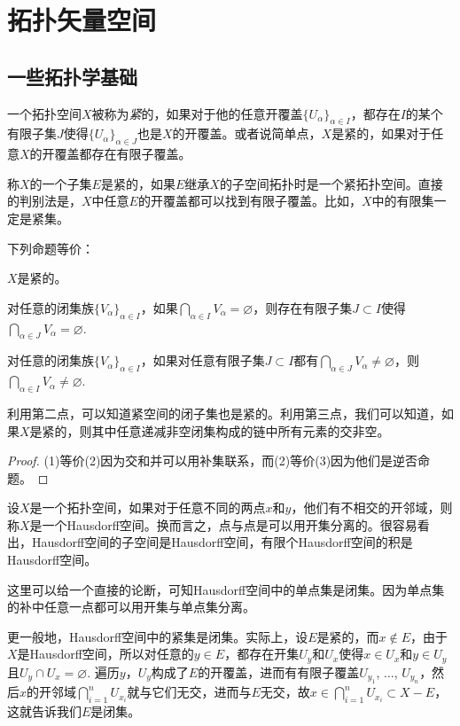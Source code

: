 \chapter{拓扑矢量空间}

\section{一些拓扑学基础}

一个拓扑空间$X$被称为\textit{紧}的，如果对于他的任意开覆盖$\{U_\alpha\}_{\alpha\in I}$，都存在$I$的某个有限子集$J$使得$\{U_\alpha\}_{\alpha\in J}$也是$X$的开覆盖。或者说简单点，$X$是紧的，如果对于任意$X$的开覆盖都存在有限子覆盖。

称$X$的一个子集$E$是紧的，如果$E$继承$X$的子空间拓扑时是一个紧拓扑空间。直接的判别法是，$X$中任意$E$的开覆盖都可以找到有限子覆盖。比如，$X$中的有限集一定是紧集。

\begin{pro}
下列命题等价：
\begin{compactenum}[(1)]
\item $X$是紧的。

\item 对任意的闭集族$\{V_\alpha\}_{\alpha\in I}$，如果$\bigcap_{\alpha\in I} V_\alpha=\varnothing$，则存在有限子集$J\subset I$使得$\bigcap_{\alpha\in J} V_\alpha=\varnothing$.

\item 对任意的闭集族$\{V_\alpha\}_{\alpha\in I}$，如果对任意有限子集$J\subset I$都有$\bigcap_{\alpha\in J} V_\alpha\neq\varnothing$，则$\bigcap_{\alpha\in I} V_\alpha\neq\varnothing$.
\end{compactenum}
\end{pro}

利用第二点，可以知道紧空间的闭子集也是紧的。利用第三点，我们可以知道，如果$X$是紧的，则其中任意递减非空闭集构成的链中所有元素的交非空。

\begin{proof}
	(1)等价(2)因为交和并可以用补集联系，而(2)等价(3)因为他们是逆否命题。
\end{proof}

\begin{para}
设$X$是一个拓扑空间，如果对于任意不同的两点$x$和$y$，他们有不相交的开邻域，则称$X$是一个Hausdorff空间。换而言之，点与点是可以用开集分离的。很容易看出，Hausdorff空间的子空间是Hausdorff空间，有限个Hausdorff空间的积是Hausdorff空间。

这里可以给一个直接的论断，可知Hausdorff空间中的单点集是闭集。因为单点集的补中任意一点都可以用开集与单点集分离。

更一般地，Hausdorff空间中的紧集是闭集。实际上，设$E$是紧的，而$x\not\in E$，由于$X$是Hausdorff空间，所以对任意的$y\in E$，都存在开集$U_y$和$U_x$使得$x\in U_x$和$y\in U_y$且$U_y\cap U_x=\varnothing$. 遍历$y$，$U_y$构成了$E$的开覆盖，进而有有限子覆盖$U_{y_1}$, $\dots$, $U_{y_n}$，然后$x$的开邻域$\bigcap_{i=1}^n U_{x_i}$就与它们无交，进而与$E$无交，故$x\in \bigcap_{i=1}^n U_{x_i}\subset X-E$，这就告诉我们$E$是闭集。
\end{para}

